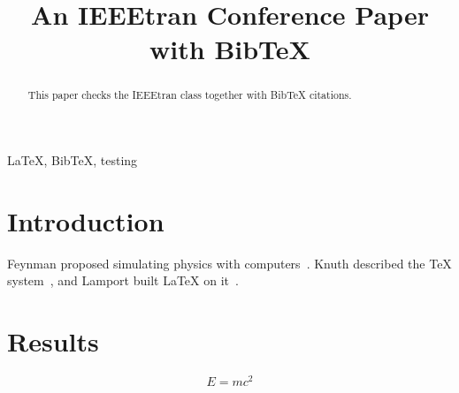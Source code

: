 \documentclass[conference]{IEEEtran}
\begin{document}
\title{An IEEEtran Conference Paper with BibTeX}
\author{
}
\maketitle

\begin{abstract}
This paper checks the IEEEtran class together with BibTeX citations.
\end{abstract}

\begin{IEEEkeywords}
LaTeX, BibTeX, testing
\end{IEEEkeywords}

\section{Introduction}
Feynman proposed simulating physics with computers~\cite{feynman1982}.
Knuth described the \TeX{} system~\cite{knuth1984}, and Lamport built \LaTeX{} on it~\cite{lamport1994}.

\section{Results}
\begin{equation}
  E = mc^2
\end{equation}



\end{document}

